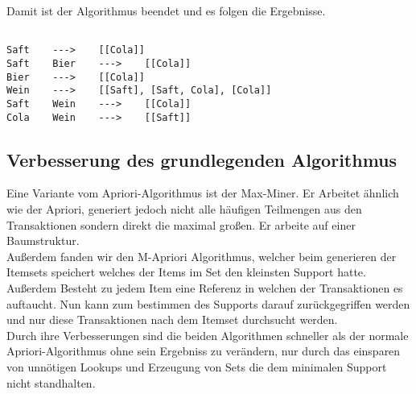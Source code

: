 \documentclass[a4paper]{article}
\begin{document}
Damit ist der Algorithmus beendet und es folgen die Ergebnisse. 
\begin{lstlisting}

Saft	--->	[[Cola]]
Saft	Bier	--->	[[Cola]]
Bier	--->	[[Cola]]
Wein	--->	[[Saft], [Saft, Cola], [Cola]]
Saft	Wein	--->	[[Cola]]
Cola	Wein	--->	[[Saft]]

\end{lstlisting}
\subsection{Verbesserung des grundlegenden Algorithmus}
Eine Variante vom Apriori-Algorithmus ist der Max-Miner. Er Arbeitet ähnlich wie der Apriori, generiert jedoch nicht alle häufigen Teilmengen aus den Transaktionen sondern direkt die maximal großen. Er arbeite auf einer Baumstruktur. \\
Außerdem fanden wir den M-Apriori Algorithmus, welcher beim generieren der Itemsets speichert welches der Items im Set den kleinsten Support hatte. Außerdem Besteht zu jedem Item eine Referenz in welchen der Transaktionen es auftaucht. Nun kann zum bestimmen des Supports darauf zurückgegriffen werden und nur diese Transaktionen nach dem Itemset durchsucht werden.\\
Durch ihre Verbesserungen sind die beiden Algorithmen schneller als der normale Apriori-Algorithmus ohne sein Ergebniss zu verändern, nur durch das einsparen von unnötigen Lookups und Erzeugung von Sets die dem minimalen Support nicht standhalten.
\end{document}

